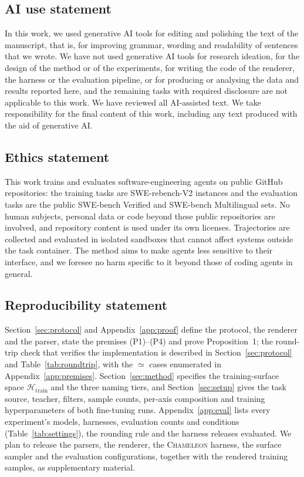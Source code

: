 \documentclass{article} %
\newcommand{\cham}{\textsc{Chameleon}}
\newcommand{\swev}{SWE-bench Verified}
\newcommand{\swem}{SWE-bench Multilingual}
\begin{document}
\subsection*{AI use statement}

In this work, we used generative AI tools for editing and polishing the text
of the manuscript, that is, for improving grammar, wording and readability of
sentences that we wrote. We have not used generative AI tools for research
ideation, for the design of the method or of the experiments, for writing the
code of the renderer, the harness or the evaluation pipeline, or for producing
or analysing the data and results reported here, and the remaining tasks with
required disclosure are not applicable to this work. We have reviewed all
AI-assisted text. We take responsibility for the final content of this work,
including any text produced with the aid of generative AI.

\subsection*{Ethics statement}

This work trains and evaluates software-engineering agents on public GitHub
repositories: the training tasks are SWE-rebench-V2 instances and the
evaluation tasks are the public \swev{} and \swem{} sets. No human subjects,
personal data or code beyond these public repositories are involved, and
repository content is used under its own licenses. Trajectories are collected
and evaluated in isolated sandboxes that cannot affect systems outside the task
container. The method aims to make agents less sensitive to their interface, and
we foresee no harm specific to it beyond those of coding agents in general.

\subsection*{Reproducibility statement}

Section~\ref{sec:protocol} and Appendix~\ref{app:proof} define the protocol,
the renderer and the parser, state the premises (P1)--(P4) and prove
Proposition~1; the round-trip check that verifies the implementation is
described in Section~\ref{sec:protocol} and Table~\ref{tab:roundtrip}, with
the $\simeq$ cases enumerated in Appendix~\ref{app:premises}.
Section~\ref{sec:method} specifies the training-surface space
$\mathcal{H}_{\mathrm{train}}$ and the three naming tiers, and
Section~\ref{sec:setup} gives the task source, teacher, filters, sample
counts, per-axis composition and training hyperparameters of both fine-tuning
runs. Appendix~\ref{app:eval} lists every experiment's models, harnesses,
evaluation counts and conditions (Table~\ref{tab:settings}), the rounding rule and the harness releases evaluated. We plan to release the parsers, the renderer, the \cham{} harness,
the surface sampler and the evaluation configurations, together with the
rendered training samples, as supplementary material.
\end{document}
